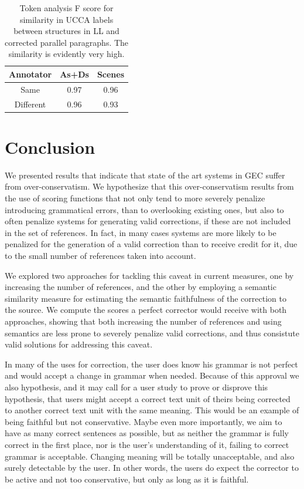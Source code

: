 \documentclass[letter,11pt]{article}
\begin{document}
\begin{table}[h!]
  \centering
  \begin{tabular}{c|c|c}
    Annotator& As+Ds & Scenes\\
    \hline
    Same  & 0.97 & 0.96\\
    Different & 0.96
    & 0.93
    \\
  \end{tabular}
  \caption{Token analysis F score for similarity in UCCA labels between structures in LL and corrected parallel paragraphs. The similarity is evidently very high.\label{tab:Token_analysis}}
\end{table}


\section{Conclusion}

We presented results that indicate that state of the art systems in GEC suffer from
over-conservatism. We hypothesize that this over-conservatism results from the use
of scoring functions that not only tend to more severely penalize introducing
grammatical errors, than to overlooking existing ones, but also to often penalize
systems for generating valid corrections, if these are not included in the set of references.
In fact, in many cases systems are more likely to be penalized for the generation of
a valid correction than to receive credit for it, due to the small number of references
taken into account.

We explored two approaches for tackling this caveat in current measures, one by
increasing the number of references, and the other by employing a semantic similarity
measure for estimating the semantic faithfulness of the correction to the source.
We compute the scores a perfect corrector would receive with both approaches, showing
that both increasing the number of references and using semantics 
are less prone to severely
penalize valid corrections, and thus consistute valid solutions for addressing this caveat.

In many of the uses for correction, the user does know his grammar
is not perfect and would accept a change in grammar when needed.
Because of this approval we also
hypothesis, and it may call for a user study to prove or disprove
this hypothesis, that users might accept a correct text unit of theirs
being corrected to another correct text unit with the same meaning.
This would be an example of being faithful but not conservative.
Maybe even more importantly, we aim to have as many correct sentences
as possible, but as neither the grammar is fully correct in the first place,
nor is the user's understanding of it, failing to correct grammar
is acceptable. Changing meaning will be totally unacceptable, and
also surely detectable by the user. In other words, the users do expect
the corrector to be active and not too conservative, but
only as long as it is faithful. 
\end{document}
